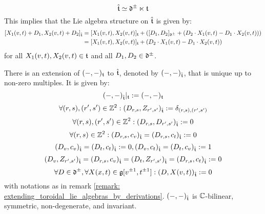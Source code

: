 \begin{remark}
                    $$\hat{\mathfrak{t}} \simeq \mathfrak{d}^{\pm} \ltimes \mathfrak{t}$$
                This implies that the Lie algebra structure on $\hat{\mathfrak{t}}$ is given by:
                    $$
                        \begin{aligned}
                            [ X_1(v, t) + D_1, X_2(v, t) + D_2 ]_{\hat{\t}} & = [X_1(v, t), X_2(v, t)]_{\t} + ( [D_1, D_2]_{\d^{\pm}} + ( D_2 \cdot X_1(v, t) - D_1 \cdot X_2(v, t) ) )
                            \\
                            & = [X_1(v, t), X_2(v, t)]_{\t} + ( D_2 \cdot X_1(v, t) - D_1 \cdot X_2(v, t) )
                        \end{aligned}
                    $$
                for all $X_1(v, t), X_2(v, t) \in \mathfrak{t}$ and all $D_1, D_2 \in \mathfrak{d}^{\pm}$.
            \end{remark}
        \begin{lemma} \label{lemma: non_degenerate_invariant_inner_product_on_extended_toroidal_algebras}
            There is an extension of $(-, -)_{\mathfrak{t}}$ to $\hat{\mathfrak{t}}$, denoted by $(-, -)_{\hat{\mathfrak{t}}}$, that is unique up to non-zero multiples. It is given by:
                $$(-, -)_{\hat{\mathfrak{t}}}|_{\mathfrak{t}} := (-, -)_{\mathfrak{t}}$$
                $$\forall (r, s), (r', s') \in \mathbb{Z}^2: (D_{r, s}, Z_{r', s'})_{\hat{\mathfrak{t}}} := \delta_{(r, s), (r', s')}$$
                $$\forall (r, s), (r', s') \in \mathbb{Z}^2: (D_{r, s}, D_{r', s'})_{\hat{\mathfrak{t}}} := 0$$
                $$\forall (r, s) \in \mathbb{Z}^2: (D_{r, s}, c_v)_{\hat{\mathfrak{t}}} = (D_{r, s}, c_t)_{\hat{\mathfrak{t}}} := 0$$ 
                $$(D_v, c_v)_{\hat{\mathfrak{t}}} = (D_t, c_t)_{\hat{\mathfrak{t}}} := 0, (D_v, c_t)_{\hat{\mathfrak{t}}} = (D_t, c_v)_{\hat{\mathfrak{t}}} := 1$$
                $$(D_v, Z_{r', s'})_{\hat{\mathfrak{t}}} = (D_{r, s}, c_v)_{\hat{\mathfrak{t}}} = (D_t, Z_{r', s'})_{\hat{\mathfrak{t}}} = (D_{r, s}, c_t)_{\hat{\mathfrak{t}}} := 0$$
                $$\forall D \in \mathfrak{d}^{\pm}, \forall X(x, t) \in \mathfrak{g}[v^{\pm 1}, t^{\pm 1}]: (D, X(v, t))_{\hat{\mathfrak{t}}} := 0$$
            with notations as in remark \ref{remark: extending_toroidal_lie_algebras_by_derivations}. $(-, -)_{\hat{\mathfrak{t}}}$ is $\mathbb{C}$-bilinear, symmetric, non-degenerate, and invariant. 
        \end{lemma}
